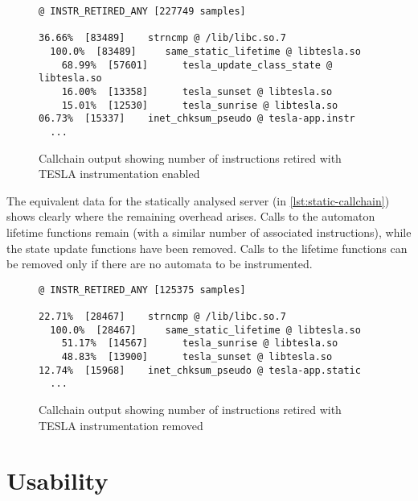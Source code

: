 \begin{figure}
  \begin{verbatim}
@ INSTR_RETIRED_ANY [227749 samples]

36.66%  [83489]    strncmp @ /lib/libc.so.7
  100.0%  [83489]     same_static_lifetime @ libtesla.so
    68.99%  [57601]      tesla_update_class_state @ libtesla.so
    16.00%  [13358]      tesla_sunset @ libtesla.so
    15.01%  [12530]      tesla_sunrise @ libtesla.so
06.73%  [15337]    inet_chksum_pseudo @ tesla-app.instr
  ...
  \end{verbatim}
  \caption{Callchain output showing number of instructions retired with
  TESLA instrumentation enabled}
  \label{lst:instr-callchain}
\end{figure}

The equivalent data for the statically analysed server (in
\autoref{lst:static-callchain}) shows clearly where the remaining
overhead arises. Calls to the automaton lifetime functions remain (with
a similar number of associated instructions), while the state update
functions have been removed. Calls to the lifetime functions can be
removed only if there are no automata to be instrumented.

\begin{figure}
  \begin{verbatim}
@ INSTR_RETIRED_ANY [125375 samples]

22.71%  [28467]    strncmp @ /lib/libc.so.7
  100.0%  [28467]     same_static_lifetime @ libtesla.so
    51.17%  [14567]      tesla_sunrise @ libtesla.so
    48.83%  [13900]      tesla_sunset @ libtesla.so
12.74%  [15968]    inet_chksum_pseudo @ tesla-app.static
  ...
  \end{verbatim}
  \caption{Callchain output showing number of instructions retired with
  TESLA instrumentation removed}
  \label{lst:static-callchain}
\end{figure}

\section{Usability}


